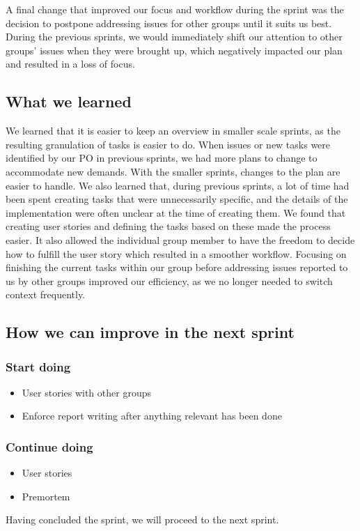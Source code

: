 A final change that improved our focus and workflow during the sprint was the decision to postpone addressing issues for other groups until it suits us best. During the previous sprints, we would immediately shift our attention to other groups' issues when they were brought up, which negatively impacted our plan and resulted in a loss of focus.

\subsection{What we learned}
We learned that it is easier to keep an overview in smaller scale sprints, as the resulting granulation of tasks is easier to do. When issues or new tasks were identified by our PO in previous sprints, we had more plans to change to accommodate new demands. With the smaller sprints, changes to the plan are easier to handle. 
We also learned that, during previous sprints, a lot of time had been spent creating tasks that were unnecessarily specific, and the details of the implementation were often unclear at the time of creating them. We found that creating user stories and defining the tasks based on these made the process easier. It also allowed the individual group member to have the freedom to decide how to fulfill the user story which resulted in a smoother workflow.  
Focusing on finishing the current tasks within our group before addressing issues reported to us by other groups improved our efficiency, as we no longer needed to switch context frequently.

\subsection{How we can improve in the next sprint}
\subsubsection{Start doing}
\begin{itemize}
    \item User stories with other groups
    \item Enforce report writing after anything relevant has been done
\end{itemize}
\subsubsection{Continue doing}
\begin{itemize}
    \item User stories
    \item Premortem
\end{itemize}

Having concluded the sprint, we will proceed to the next sprint.

